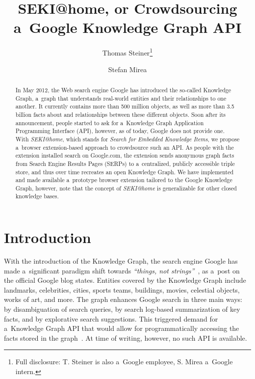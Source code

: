 \documentclass[runningheads,a4paper]{llncs}
\begin{document}
\title{SEKI@home, or Crowdsourcing\\ a~Google Knowledge Graph API}

\author{
  Thomas Steiner\thanks{Full disclosure: T. Steiner is also a~Google employee, S. Mirea a~Google intern.} \and
  Stefan Mirea
}


\maketitle
\setcounter{footnote}{0}

\begin{abstract}
In May 2012, the Web search engine Google has introduced the so-called Knowledge Graph,
a~graph that understands real-world entities and their relationships to one another.
It currently contains more than 500 million objects,
as well as more than 3.5 billion facts about
and relationships between these different objects.
Soon after its announcement, people started to ask
for a~Knowledge Graph Application Programming Interface (API),
however, as of today, Google does not provide one.
With \emph{SEKI@home}, which stands for \emph{Search for Embedded Knowledge Items},
we propose a~browser extension-based approach to crowdsource such an API.
As people with the extension installed search on Google.com,
the extension sends anonymous graph facts from Search Engine Results Pages (SERPs)
to a~centralized, publicly accessible triple store,
and thus over time recreates an open Knowledge Graph.
We have implemented and made available a~prototype browser extension
tailored to the Google Knowledge Graph, however,
note that the concept of \emph{SEKI@home} is generalizable for other closed knowledge bases.
\end{abstract}

\section{Introduction}
With the introduction of the Knowledge Graph, the search engine Google
has made a~significant paradigm shift towards \textit{``things, not strings''}~\cite{singhal2012},
as a~post on the official Google blog states.
Entities covered by the Knowledge Graph include landmarks, celebrities, cities, sports
teams, buildings, movies, celestial objects, works of art, and more.
The graph enhances Google search in three main ways:
by disambiguation of search queries,
by search log-based summarization of key facts,
and by explorative search suggestions.
This triggered demand for a~Knowledge Graph API that would allow for
programmatically accessing the facts stored in the graph~\cite{quora2012}.
At time of writing, however, no such API is available.
\end{document}
